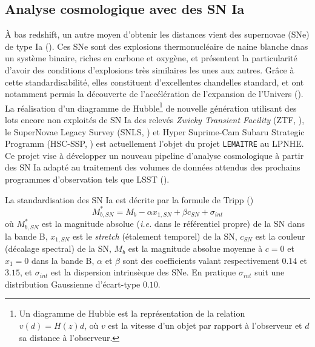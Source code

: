 \documentclass{book}
\def\lemaitre{\texttt{LEMAITRE}\xspace}
\begin{document}
\subsection{Analyse cosmologique avec des SN Ia}

À bas redshift, un autre moyen d'obtenir les distances vient des supernovae (SNe) de type Ia (\cite{hoyle_nucleosynthesis_1960}). Ces SNe sont des explosions thermonucléaire de naine blanche dnas un système binaire, riches en carbone et oxygène, et présentent la particularité d’avoir des conditions d'explosions très similaires les unes aux autres. Grâce à cette standardisabilité, elles constituent d'excellentes chandelles standard, et ont notamment permis la découverte de l'accélération de l'expansion de l'Univers (\cite{perlmutter_cosmology_1998, riess_observational_1998}). La réalisation d'un diagramme de Hubble\footnote{Un diagramme de Hubble est la représentation de la relation $v(d)=H(z) d$, où $v$ est la vitesse d'un objet par rapport à l'observeur et $d$ sa distance à l'observeur.} de nouvelle génération utilisant des lots encore non exploités de SN Ia des relevés \textit{Zwicky Transient Facility} (ZTF, \cite{bellm_zwicky_2018}), le SuperNovae Legacy Survey (SNLS, \cite{pritchet_snls_2004}) et Hyper Suprime-Cam Subaru Strategic Programm (HSC-SSP, \cite{miyazaki_hyper_2012,aihara_hyper_2018}) est actuellement l’objet du projet \lemaitre au LPNHE. Ce projet vise à développer un nouveau pipeline d'analyse cosmologique à partir des SN Ia adapté au traitement des volumes de données attendus des prochains programmes d’observation tels que LSST (\cite{the_lsst_dark_energy_science_collaboration_lsst_2021}).

La standardisation des SN Ia est décrite par la formule de Tripp (\cite{tripp_two-parameter_1998})
\begin{equation}
\label{eq:tripp}
    M^*_{b,SN} = M_b - \alpha x_{1,SN} + \beta c_{SN} + \sigma_{int}
\end{equation}
où $M^*_{b,SN}$ est la magnitude absolue (\textit{i.e.} dans le référentiel propre) de la SN dans la bande B, $x_{1,SN}$ est le \textit{stretch} (étalement temporel) de la SN, $c_{SN}$ est la couleur (décalage spectral) de la SN, $M_b$ est la magnitude absolue moyenne à $c=0$ et $x_1=0$ dans la bande B, $\alpha$ et $\beta$ sont des coefficients valant respectivement $0.14$ et $3.15$, et $\sigma_{int}$ est la dispersion intrinsèque des SNe. En pratique $\sigma_{int}$ suit une distribution Gaussienne d'écart-type $0.10$.
\end{document}
